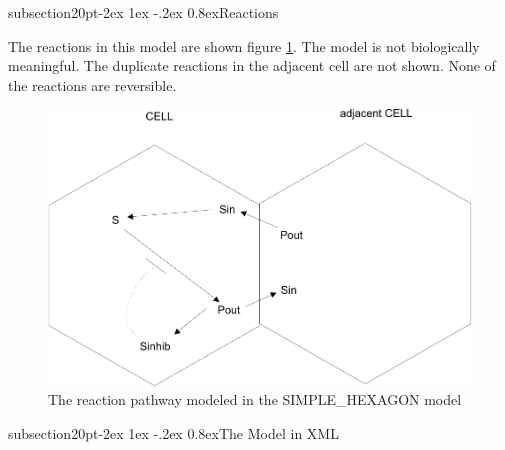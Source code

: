 \documentclass[10pt]{article}
\makeatletter
\renewcommand{\subsection}{\@startsection%
  {subsection}{2}{0pt}{-2ex \@plus 1ex \@minus -.2ex}%
  {0.8ex}{\slshape\large\bfseries\sffamily}}
\makeatother
\begin{document}
\subsection{Reactions}

The reactions in this model are shown figure \ref{fig:cell}.
The model is not biologically meaningful.  The duplicate reactions in the
adjacent cell are not shown.  None of the reactions are reversible.

\begin{figure}

  \centering

  \includegraphics[scale = 0.75]{cell}

  \caption{The reaction pathway modeled in the SIMPLE\_HEXAGON model}

  \label{fig:cell}

\end{figure}

\subsection{The Model in XML}
\end{document}
